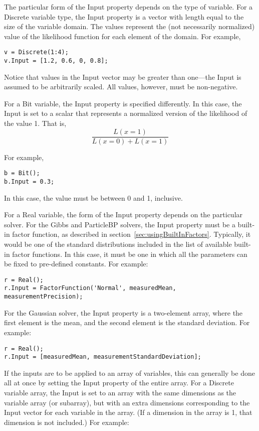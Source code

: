 The particular form of the Input property depends on the type of variable.  For a Discrete variable type, the Input property is a vector with length equal to the size of the variable domain.  The values represent the (not necessarily normalized) value of the likelihood function for each element of the domain.  For example,

\begin{lstlisting}
v = Discrete(1:4);
v.Input = [1.2, 0.6, 0, 0.8];
\end{lstlisting}

Notice that values in the Input vector may be greater than one---the Input is assumed to be arbitrarily scaled.  All values, however, must be non-negative.

For a Bit variable, the Input property is specified differently.  In this case, the Input is set to a scalar that represents a normalized version of the likelihood of the value 1.  That is,
%
\[
\frac{L(x=1)}{L(x=0) + L(x=1)}
\]

For example,

\begin{lstlisting}
b = Bit();
b.Input = 0.3;
\end{lstlisting}

In this case, the value must be between 0 and 1, inclusive.

For a Real variable, the form of the Input property depends on the particular solver.  For the Gibbs and ParticleBP solvers, the Input property must be a built-in factor function, as described in section~\ref{sec:usingBuiltInFactors}.  Typically, it would be one of the standard distributions included in the list of available built-in factor functions.  In this case, it must be one in which all the parameters can be fixed to pre-defined constants.  For example:

\begin{lstlisting}
r = Real();
r.Input = FactorFunction('Normal', measuredMean, measurementPrecision);
\end{lstlisting}

For the Gaussian solver, the Input property is a two-element array, where the first element is the mean, and the second element is the standard deviation.  For example:

\begin{lstlisting}
r = Real();
r.Input = [measuredMean, measurementStandardDeviation];
\end{lstlisting}

If the inputs are to be applied to an array of variables, this can generally be done all at once by setting the Input property of the entire array.  For a Discrete variable array, the Input is set to an array with the same dimensions as the variable array (or subarray), but with an extra dimensions corresponding to the Input vector for each variable in the array.  (If a dimension in the array is 1, that dimension is not included.) For example:

